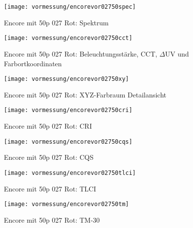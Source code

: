 \documentclass[pagesize,paper=A4,fontsize=12pt,utf8,numbers=noenddot,bibliography=totoc,listof=totoc,DIV=11,BCOR=1mm]{scrreprt}
\begin{document}
\begin{figure}[htp]     %
\centering
\texttt{[image: vormessung/encorevor02750spec]} 
\caption {Encore mit 50p 027 Rot: Spektrum} 
\end{figure}

\begin{figure}[htp]     %
\centering
\texttt{[image: vormessung/encorevor02750cct]} 
\caption {Encore mit 50p 027 Rot: Beleuchtungsstärke, CCT, $\Delta$UV und Farbortkoordinaten} 
\end{figure}

\begin{figure}[htp]     %
\centering
\texttt{[image: vormessung/encorevor02750xy]} 
\caption {Encore mit 50p 027 Rot: XYZ-Farbraum Detailansicht} 
\end{figure}

\begin{figure}[htp]     %
\centering
\texttt{[image: vormessung/encorevor02750cri]} 
\caption {Encore mit 50p 027 Rot: CRI} 
\end{figure}

\begin{figure}[htp]     %
\centering
\texttt{[image: vormessung/encorevor02750cqs]} 
\caption {Encore mit 50p 027 Rot: CQS} 
\end{figure}

\begin{figure}[htp]     %
\centering
\texttt{[image: vormessung/encorevor02750tlci]} 
\caption {Encore mit 50p 027 Rot: TLCI} 
\end{figure}

\begin{figure}[htp]     %
\centering
\texttt{[image: vormessung/encorevor02750tm]} 
\caption {Encore mit 50p 027 Rot: TM-30} 
\end{figure}
\end{document}
